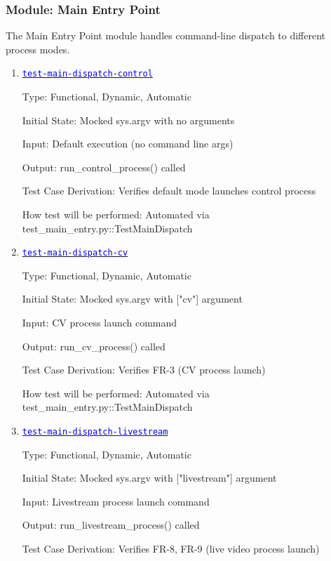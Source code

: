 \documentclass[12pt, titlepage]{article}
\newcommand{\tid}[1]{\hyperlink{tid:#1}{\textcolor{blue}{\texttt{#1}}}}
\begin{document}
\subsubsection{Module: Main Entry Point}

The Main Entry Point module handles command-line dispatch to different process
modes.

\begin{enumerate}

  \item{\tid{test-main-dispatch-control}\\}

        Type: Functional, Dynamic, Automatic

        Initial State: Mocked sys.argv with no arguments

        Input: Default execution (no command line args)

        Output: run\_control\_process() called

        Test Case Derivation: Verifies default mode launches control process

        How test will be performed: Automated via
        test\_main\_entry.py::TestMainDispatch

  \item{\tid{test-main-dispatch-cv}\\}

        Type: Functional, Dynamic, Automatic

        Initial State: Mocked sys.argv with ["cv"] argument

        Input: CV process launch command

        Output: run\_cv\_process() called

        Test Case Derivation: Verifies FR-3 (CV process launch)

        How test will be performed: Automated via
        test\_main\_entry.py::TestMainDispatch

  \item{\tid{test-main-dispatch-livestream}\\}

        Type: Functional, Dynamic, Automatic

        Initial State: Mocked sys.argv with ["livestream"] argument

        Input: Livestream process launch command

        Output: run\_livestream\_process() called

        Test Case Derivation: Verifies FR-8, FR-9 (live video process launch)


\end{enumerate}
\end{document}
